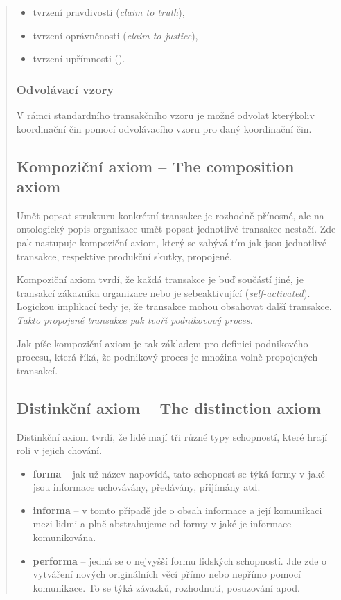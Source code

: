 \documentclass[]{article}
\begin{document}
\begin{quote}
\begin{itemize}
\item tvrzení pravdivosti (\textit{claim to truth}),
\item tvrzení oprávněnosti (\textit{claim to justice}),
\item tvrzení upřímnosti ().
\end{itemize}

\subsubsection{Odvolávací vzory}
V rámci standardního transakčního vzoru je možné odvolat kterýkoliv koordinační čin pomocí odvolávacího vzoru pro daný koordinační čin.

\subsection{Kompoziční axiom – The composition axiom} \label{sec:kompozicni_axiom}
Umět popsat strukturu konkrétní transakce je rozhodně přínosné, ale na ontologický popis organizace umět popsat jednotlivé transakce nestačí. Zde pak nastupuje kompoziční axiom, který se zabývá tím jak jsou jednotlivé transakce, respektive produkční skutky, propojené.

Kompoziční axiom tvrdí, že každá transakce je buď součástí jiné, je transakcí zákazníka organizace nebo je sebeaktivující (\textit{self-activated}). Logickou implikací tedy je, že transakce mohou obsahovat další transakce. \textit{Takto propojené transakce pak tvoří podnikovový proces.}

Jak píše \cite{Dietz2006} kompoziční axiom je tak základem pro definici podnikového procesu, která říká, že podnikový proces je množina volně propojených transakcí. 


\subsection{Distinkční axiom – The distinction axiom} \label{sec:distinction_axiom}
Distinkční axiom tvrdí, že lidé mají tři různé typy schopností, které hrají roli v jejich chování.

\begin{itemize}
\item \textbf{forma} – jak už název napovídá, tato schopnost se týká formy v jaké jsou informace uchovávány, předávány, přijímány atd.
\item \textbf{informa} – v tomto případě jde o obsah informace a její komunikaci mezi lidmi a plně abstrahujeme od formy v jaké je informace komunikována.
\item \textbf{performa} – jedná se o nejvyšší formu lidských schopností. Jde zde o vytváření nových originálních věcí přímo nebo nepřímo pomocí komunikace. To se týká závazků, rozhodnutí, posuzování apod.
\end{itemize}


\end{quote}
\end{document}
